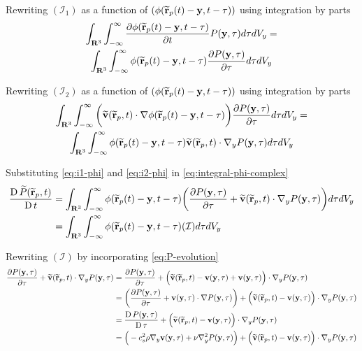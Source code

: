 Rewriting $(\mathcal{I}_1)$ as a function of $(\phi (\widetilde{\mathbf{r}}_p(t)-\mathbf{y}, t-\tau))$ using integration by parts
\begin{multline}
    \IntRThreeAndT \PartialDerivative{\PhiRY} \PY \IntD =\\ \IntRThreeAndT \PhiRY \PartialDerivative[\tau]{\PY} \IntD
    \label{eq:i1-phi}
\end{multline}

Rewriting $(\mathcal{I}_2)$ as a function of $(\phi (\widetilde{\mathbf{r}}_p(t)-\mathbf{y}, t-\tau))$ using integration by parts
\begin{multline}
    \IntRThreeAndT \bigg(\TildeVArgRp \cdot \nabla \PhiRY \bigg) \PartialDerivative[\tau]{\PY} \IntD =\\ \IntRThreeAndT \PhiRY \TildeVArgRp \cdot  \nabla_y \PY \IntD
    \label{eq:i2-phi}
\end{multline}

Substituting \ref{eq:i1-phi} and \ref{eq:i2-phi} in \ref{eq:integral-phi-complex}
\begin{equation}
    \begin{split}
        \LagDerivative{\TilePArgRp} & = \IntRThreeAndT \PhiRY \bigg(\PartialDerivative[\tau]{\PY} + \TildeVArgRp \cdot \nabla_y \PY \bigg)\IntD \\
        & = \IntRThreeAndT \PhiRY (\mathcal{I}) \IntD
    \end{split}
    \label{eq:phi-simplified-P-eq}
\end{equation}


Rewriting $(\mathcal{I})$ by incorporating \ref{eq:P-evolution}
\begin{equation}
    \begin{split}
        \PartialDerivative[\tau]{\PY} + \TildeVArgRp \cdot \nabla_y \PY & = \PartialDerivative[\tau]{\PY} + \Big(\TildeVArgRp - \VY + \VY \Big) \cdot \nabla_y \PY \\
        & = \bigg(\PartialDerivative[\tau]{\PY} + \VY \cdot \nabla \PY \bigg) + \Big(\TildeVArgRp - \VY \Big) \cdot \nabla_y \PY \\
        & = \LagDerivative[\tau]{\PY} + \Big(\TildeVArgRp - \VY \Big) \cdot \nabla_y \PY \\
        & = \Big(-c_s^2 \rho \nabla_y \VY + \nu \nabla^2_y \PY   \Big) + \Big(\TildeVArgRp - \VY \Big) \cdot \nabla_y \PY
    \end{split}
    \label{eq:simplified-integrand}
\end{equation}

